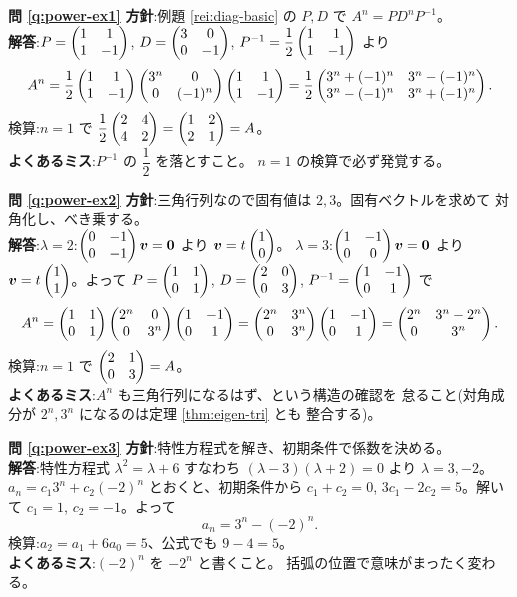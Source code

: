 \bigskip
\noindent\textbf{問 \ref{q:power-ex1}}\quad
\textbf{方針}:例題 \ref{rei:diag-basic} の $P, D$ で
$A^n = PD^nP^{-1}$。\\
\textbf{解答}:$P = \begin{pmatrix}1 & 1 \\ 1 & -1\end{pmatrix}$, $D = \begin{pmatrix}3 & 0 \\ 0 & -1\end{pmatrix}$,
$P^{-1} = \dfrac{1}{2}\begin{pmatrix}1 & 1 \\ 1 & -1\end{pmatrix}$ より
\[
A^n = \frac{1}{2}\begin{pmatrix}1 & 1 \\ 1 & -1\end{pmatrix}\begin{pmatrix}3^n & 0 \\ 0 & (-1)^n\end{pmatrix}
\begin{pmatrix}1 & 1 \\ 1 & -1\end{pmatrix}
= \frac{1}{2}\begin{pmatrix}3^n + (-1)^n & 3^n - (-1)^n \\
3^n - (-1)^n & 3^n + (-1)^n\end{pmatrix}.
\]
検算:$n = 1$ で $\dfrac{1}{2}\begin{pmatrix}2 & 4 \\ 4 & 2\end{pmatrix} = \begin{pmatrix}1 & 2 \\ 2 & 1\end{pmatrix} = A$。\\
\textbf{よくあるミス}:$P^{-1}$ の $\dfrac{1}{2}$ を落とすこと。
$n = 1$ の検算で必ず発覚する。

\bigskip
\noindent\textbf{問 \ref{q:power-ex2}}\quad
\textbf{方針}:三角行列なので固有値は $2, 3$。固有ベクトルを求めて
対角化し、べき乗する。\\
\textbf{解答}:$\lambda = 2$:$\begin{pmatrix}0 & -1 \\ 0 & -1\end{pmatrix}\bm{v} = \bm{0}$
より $\bm{v} = t\begin{pmatrix}1 \\ 0\end{pmatrix}$。
$\lambda = 3$:$\begin{pmatrix}1 & -1 \\ 0 & 0\end{pmatrix}\bm{v} = \bm{0}$ より
$\bm{v} = t\begin{pmatrix}1 \\ 1\end{pmatrix}$。よって
$P = \begin{pmatrix}1 & 1 \\ 0 & 1\end{pmatrix}$, $D = \begin{pmatrix}2 & 0 \\ 0 & 3\end{pmatrix}$,
$P^{-1} = \begin{pmatrix}1 & -1 \\ 0 & 1\end{pmatrix}$ で
\[
A^n = \begin{pmatrix}1 & 1 \\ 0 & 1\end{pmatrix}\begin{pmatrix}2^n & 0 \\ 0 & 3^n\end{pmatrix}\begin{pmatrix}1 & -1 \\ 0 & 1\end{pmatrix}
= \begin{pmatrix}2^n & 3^n \\ 0 & 3^n\end{pmatrix}\begin{pmatrix}1 & -1 \\ 0 & 1\end{pmatrix}
= \begin{pmatrix}2^n & 3^n - 2^n \\ 0 & 3^n\end{pmatrix}.
\]
検算:$n = 1$ で $\begin{pmatrix}2 & 1 \\ 0 & 3\end{pmatrix} = A$。\\
\textbf{よくあるミス}:$A^n$ も三角行列になるはず、という構造の確認を
怠ること(対角成分が $2^n, 3^n$ になるのは定理 \ref{thm:eigen-tri} とも
整合する)。

\bigskip
\noindent\textbf{問 \ref{q:power-ex3}}\quad
\textbf{方針}:特性方程式を解き、初期条件で係数を決める。\\
\textbf{解答}:特性方程式 $\lambda^2 = \lambda + 6$ すなわち
$(\lambda - 3)(\lambda + 2) = 0$ より $\lambda = 3, -2$。
$a_n = c_1 3^n + c_2 (-2)^n$ とおくと、初期条件から
$c_1 + c_2 = 0$, $3c_1 - 2c_2 = 5$。解いて $c_1 = 1$, $c_2 = -1$。よって
\[
a_n = 3^n - (-2)^n.
\]
検算:$a_2 = a_1 + 6a_0 = 5$、公式でも $9 - 4 = 5$。\\
\textbf{よくあるミス}:$(-2)^n$ を $-2^n$ と書くこと。
括弧の位置で意味がまったく変わる。

